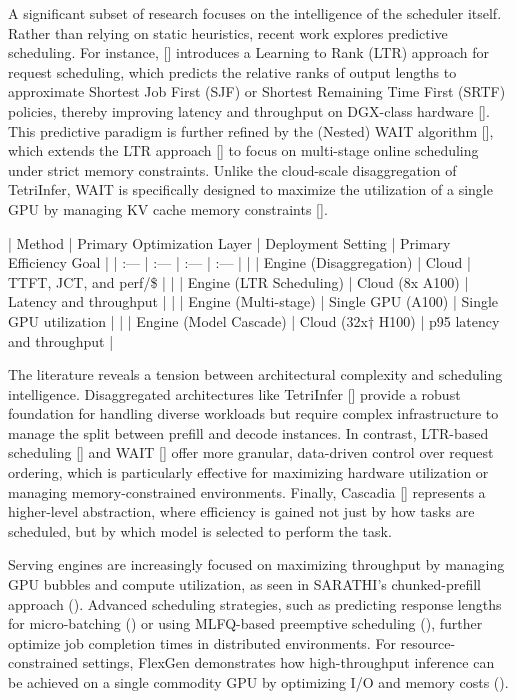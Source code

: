 \documentclass[11pt]{article}
\begin{document}
A significant subset of research focuses on the intelligence of the scheduler itself. Rather than relying on static heuristics, recent work explores predictive scheduling. For instance, [\citep{2408.15792}] introduces a Learning to Rank (LTR) approach for request scheduling, which predicts the relative ranks of output lengths to approximate Shortest Job First (SJF) or Shortest Remaining Time First (SRTF) policies, thereby improving latency and throughput on DGX-class hardware [\citep{2408.15792}]. This predictive paradigm is further refined by the (Nested) WAIT algorithm [\citep{2504.11320}], which extends the LTR approach [\citep{2408.15792}] to focus on multi-stage online scheduling under strict memory constraints. Unlike the cloud-scale disaggregation of TetriInfer, WAIT is specifically designed to maximize the utilization of a single GPU by managing KV cache memory constraints [\citep{2504.11320}].

| Method | Primary Optimization Layer | Deployment Setting | Primary Efficiency Goal |
| :--- | :--- | :--- | :--- |
| \citep{2401.11181} | Engine (Disaggregation) | Cloud | TTFT, JCT, and perf/\$ |
| \citep{2408.15792} | Engine (LTR Scheduling) | Cloud (8x A100) | Latency and throughput |
| \citep{2504.11320} | Engine (Multi-stage) | Single GPU (A100) | Single GPU utilization |
| \citep{2506.04203} | Engine (Model Cascade) | Cloud (32x† H100) | p95 latency and throughput |

The literature reveals a tension between architectural complexity and scheduling intelligence. Disaggregated architectures like TetriInfer [\citep{2401.11181}] provide a robust foundation for handling diverse workloads but require complex infrastructure to manage the split between prefill and decode instances. In contrast, LTR-based scheduling [\citep{2408.15792}] and WAIT [\citep{2504.11320}] offer more granular, data-driven control over request ordering, which is particularly effective for maximizing hardware utilization or managing memory-constrained environments. Finally, Cascadia [\citep{2506.04203}] represents a higher-level abstraction, where efficiency is gained not just by how tasks are scheduled, but by which model is selected to perform the task.

Serving engines are increasingly focused on maximizing throughput by managing GPU bubbles and compute utilization, as seen in SARATHI's chunked-prefill approach (\citep{2308.16369}). Advanced scheduling strategies, such as predicting response lengths for micro-batching (\citep{2305.13144}) or using MLFQ-based preemptive scheduling (\citep{2305.05920}), further optimize job completion times in distributed environments. For resource-constrained settings, FlexGen demonstrates how high-throughput inference can be achieved on a single commodity GPU by optimizing I/O and memory costs (\citep{2303.06865}).
\end{document}
